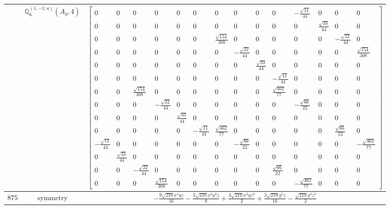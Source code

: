 \documentclass[fleqn,8pt,landscape]{jsarticle}
\begin{document}
\begin{longtable}{ccc}
$  $ & $ \mathbb{Q}_{6}^{(1,-1;a)}(A_{g},4) $ & $ \begin{bmatrix} 0 & 0 & 0 & 0 & 0 & 0 & 0 & 0 & 0 & 0 & - \frac{\sqrt{11}}{44} & 0 & 0 & 0 \\ 0 & 0 & 0 & 0 & 0 & 0 & 0 & 0 & 0 & 0 & 0 & \frac{\sqrt{33}}{44} & 0 & 0 \\ 0 & 0 & 0 & 0 & 0 & 0 & \frac{\sqrt{154}}{308} & 0 & 0 & 0 & 0 & 0 & - \frac{\sqrt{22}}{44} & 0 \\ 0 & 0 & 0 & 0 & 0 & 0 & 0 & - \frac{\sqrt{22}}{44} & 0 & 0 & 0 & 0 & 0 & \frac{\sqrt{154}}{308} \\ 0 & 0 & 0 & 0 & 0 & 0 & 0 & 0 & \frac{\sqrt{33}}{44} & 0 & 0 & 0 & 0 & 0 \\ 0 & 0 & 0 & 0 & 0 & 0 & 0 & 0 & 0 & - \frac{\sqrt{11}}{44} & 0 & 0 & 0 & 0 \\ 0 & 0 & \frac{\sqrt{154}}{308} & 0 & 0 & 0 & 0 & 0 & 0 & \frac{\sqrt{462}}{77} & 0 & 0 & 0 & 0 \\ 0 & 0 & 0 & - \frac{\sqrt{22}}{44} & 0 & 0 & 0 & 0 & 0 & 0 & - \frac{\sqrt{66}}{22} & 0 & 0 & 0 \\ 0 & 0 & 0 & 0 & \frac{\sqrt{33}}{44} & 0 & 0 & 0 & 0 & 0 & 0 & 0 & 0 & 0 \\ 0 & 0 & 0 & 0 & 0 & - \frac{\sqrt{11}}{44} & \frac{\sqrt{462}}{77} & 0 & 0 & 0 & 0 & 0 & \frac{\sqrt{66}}{22} & 0 \\ - \frac{\sqrt{11}}{44} & 0 & 0 & 0 & 0 & 0 & 0 & - \frac{\sqrt{66}}{22} & 0 & 0 & 0 & 0 & 0 & - \frac{\sqrt{462}}{77} \\ 0 & \frac{\sqrt{33}}{44} & 0 & 0 & 0 & 0 & 0 & 0 & 0 & 0 & 0 & 0 & 0 & 0 \\ 0 & 0 & - \frac{\sqrt{22}}{44} & 0 & 0 & 0 & 0 & 0 & 0 & \frac{\sqrt{66}}{22} & 0 & 0 & 0 & 0 \\ 0 & 0 & 0 & \frac{\sqrt{154}}{308} & 0 & 0 & 0 & 0 & 0 & 0 & - \frac{\sqrt{462}}{77} & 0 & 0 & 0 \end{bmatrix} $ \\ \hline
$ 875 $ & $ \text{symmetry} $ & $ - \frac{9 \sqrt{210} x^{4} y z}{16} - \frac{3 \sqrt{210} x^{2} y^{3} z}{8} + \frac{3 \sqrt{210} x^{2} y z^{3}}{2} + \frac{3 \sqrt{210} y^{5} z}{16} - \frac{\sqrt{210} y^{3} z^{3}}{2} $ \\

\end{longtable}
\end{document}
